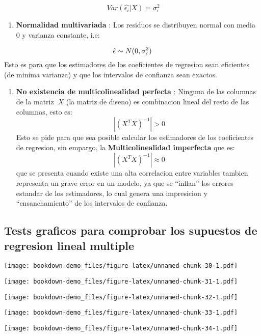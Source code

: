 \documentclass[]{book}
\providecommand{\tightlist}{%
  \setlength{\itemsep}{0pt}\setlength{\parskip}{0pt}}
\begin{document}
\[ \ Var(\hat{\epsilon_{i}}|X) = \sigma_{\epsilon}^{2} \]

\begin{enumerate}
\def\labelenumi{\arabic{enumi}.}
\setcounter{enumi}{2}
\tightlist
\item
  \textbf{Normalidad multivariada} : Los residuos se distribuyen normal
  con media 0 y varianza constante, i.e:
\end{enumerate}

\[ \hat{\epsilon}  \sim {\sf }N(0,\sigma_{\epsilon}^{2}) \] Esto es para
que los estimadores de los coeficientes de regresion sean eficientes (de
minima varianza) y que los intervalos de confianza sean exactos.

\begin{enumerate}
\def\labelenumi{\arabic{enumi}.}
\setcounter{enumi}{3}
\tightlist
\item
  \textbf{No existencia de multicolinealidad perfecta} : Ninguna de las
  columnas de la matriz \(\ X\) (la matriz de diseno) es combinacion
  lineal del resto de las columnas, esto es: \[ \ |(X^{T}X)^{-1}| > 0 \]
  Esto se pide para que sea posible calcular los estimadores de los
  coeficientes de regresion, sin empargo, la \textbf{Multicolinealidad
  imperfecta} que es: \[ \ |(X^{T}X)^{-1}| \approx 0 \] que se presenta
  cuando existe una alta correlacion entre variables tambien representa
  un grave error en un modelo, ya que se ``inflan'' los errores estandar
  de los estimadores, lo cual genera una impresicion y
  ``ensanchamiento'' de los intervalos de confianza.
\end{enumerate}

\subsection{Tests graficos para comprobar los supuestos de regresion
lineal
multiple}\label{tests-graficos-para-comprobar-los-supuestos-de-regresion-lineal-multiple}

\texttt{[image: bookdown-demo\_files/figure-latex/unnamed-chunk-30-1.pdf]}

\texttt{[image: bookdown-demo\_files/figure-latex/unnamed-chunk-31-1.pdf]}

\texttt{[image: bookdown-demo\_files/figure-latex/unnamed-chunk-32-1.pdf]}

\texttt{[image: bookdown-demo\_files/figure-latex/unnamed-chunk-33-1.pdf]}

\texttt{[image: bookdown-demo\_files/figure-latex/unnamed-chunk-34-1.pdf]}
\end{document}
